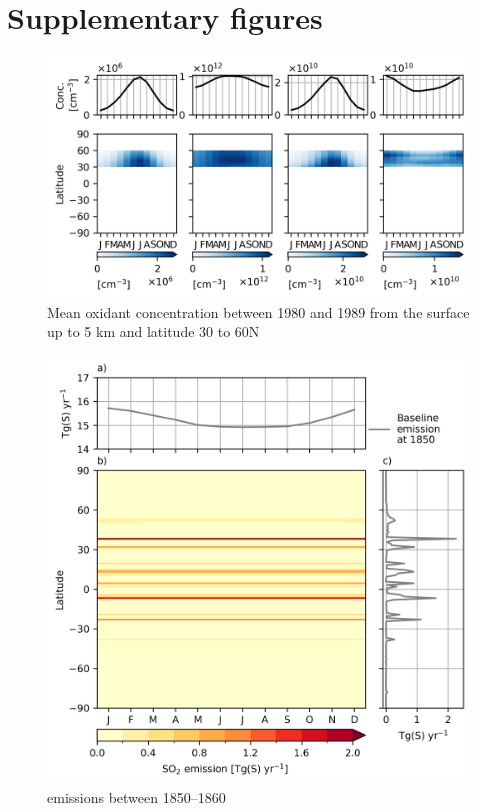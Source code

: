 \section{Supplementary figures}
\begin{figure}
    \centering
    \includegraphics{Appendix1/figs/seasonal_oxidant_1980_lat30-60.png}
    \caption{Mean oxidant concentration between 1980 and 1989 from the surface up to 5 km and latitude 30 to 60\textdegree N }
    \label{fig:app1:seasonal-oxidant-30-60}
\end{figure}

\begin{figure}
    \centering
    \includegraphics{Appendix1/figs/emiso2_monthly_1850.png}
    \caption[ emissions between 1850--1860]{ emissions between 1850--1860}
    \label{fig:app1:seasonal-emiso2-1850}
\end{figure}

